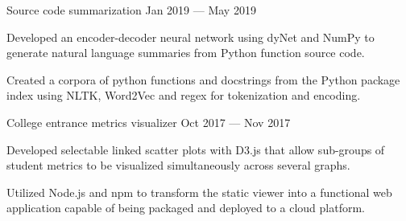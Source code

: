 
\vspace{-0.1cm}

\begin{cventries}

  \cventry
    {} %
    {Source code summarization \href{https://github.com/pauldhein/code-summarization}{\faExternalLink}} %
    {Jan 2019 --- May 2019} %
    {} %
    {
      \vspace{-1cm}
      \begin{cvitems} %
        \item Developed an encoder-decoder neural network using dyNet and NumPy to generate natural language summaries from Python function source code.
        \item Created a corpora of python functions and docstrings from the Python package index using NLTK, Word2Vec and regex for tokenization and encoding.
      \end{cvitems}
    }
  \vspace{.2cm}
  \cventry
    {} %
    {College entrance metrics visualizer \href{https://github.com/pauldhein/student-data-visualizer}{\faExternalLink}} %
    {Oct 2017 --- Nov 2017} %
    {} %
    {
      \vspace{-1cm}
      \begin{cvitems} %
        \item Developed selectable linked scatter plots with D3.js that allow sub-groups of student metrics to be visualized simultaneously across several graphs.
        \item Utilized Node.js and npm to transform the static viewer into a functional web application capable of being packaged and deployed to a cloud platform.
      \end{cvitems}
    }

\end{cventries}
